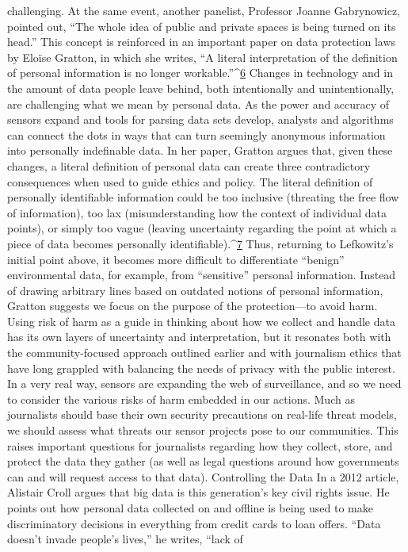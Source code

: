 challenging. At the same event, another panelist, Professor Joanne
Gabrynowicz, pointed out, ``The whole idea of public and private spaces
is being turned on its head.'' This concept is reinforced in an important
paper on data protection laws by Eloïse Gratton, in which she writes,
``A literal interpretation of the definition of personal information is no
longer workable.''^{\href{#endnotes-stearns}{6}}
Changes in technology and in the amount of data people leave behind, both
intentionally and unintentionally, are challenging what we mean by personal
data. As the power and accuracy of sensors expand and tools for parsing
data sets develop, analysts and algorithms can connect the dots in ways
that can turn seemingly anonymous information into personally indefinable
data. In her paper, Gratton argues that, given these changes, a literal definition of personal data can create three contradictory consequences when
used to guide ethics and policy. The literal definition of personally identifiable
information could be too inclusive (threating the free flow of information),
too lax (misunderstanding how the context of individual data points),
or simply too vague (leaving uncertainty regarding the point at which a
piece of data becomes personally identifiable).^{\href{#endnotes-stearns}{7}}
Thus, returning to Lefkowitz's initial point above, it becomes more difficult
to differentiate ``benign'' environmental data, for example, from ``sensitive''
personal information. Instead of drawing arbitrary lines based on outdated
notions of personal information, Gratton suggests we focus on the purpose
of the protection—to avoid harm. Using risk of harm as a guide in thinking
about how we collect and handle data has its own layers of uncertainty and
interpretation, but it resonates both with the community-focused approach
outlined earlier and with journalism ethics that have long grappled with
balancing the needs of privacy with the public interest.
In a very real way, sensors are expanding the web of surveillance, and so we
need to consider the various risks of harm embedded in our actions. Much
as journalists should base their own security precautions on real-life threat
models, we should assess what threats our sensor projects pose to our communities.
This raises important questions for journalists regarding how
they collect, store, and protect the data they gather (as well as legal questions
around how governments can and will request access to that data).
Controlling the Data
In a 2012 article, Alistair Croll argues that big data is this generation's key
civil rights issue. He points out how personal data collected on and offline
is being used to make discriminatory decisions in everything from credit
cards to loan offers. ``Data doesn't invade people's lives,'' he writes, ``lack of

